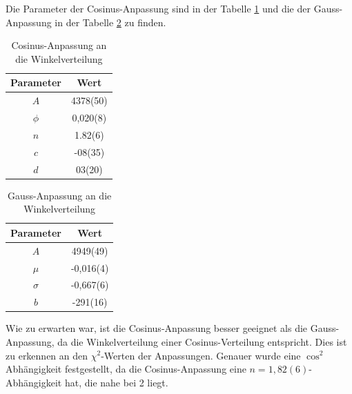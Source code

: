 \documentclass{article}
\begin{document}
Die Parameter der Cosinus-Anpassung sind in der Tabelle \ref{tab:CosinusAnpassungWinkelverteilung} und die der Gauss-Anpassung in der Tabelle \ref{tab:GaussAnpassungWinkelverteilung} zu finden.
\begin{table}[H]
    \centering
    \caption{Cosinus-Anpassung an die Winkelverteilung}
    \begin{tabular}{|c|c|}
        \hline
        Parameter & Wert \\ \hline \hline
        $A$ & 4378(50) \\ \hline 
        $\phi$ & 0,020(8) \\ \hline
        $n$ & 1.82(6) \\ \hline
        $c$ & -08(35) \\ \hline
        $d$ & 03(20) \\ \hline
    \end{tabular}
    \label{tab:CosinusAnpassungWinkelverteilung}
\end{table}
\begin{table}[H]
    \centering
    \caption{Gauss-Anpassung an die Winkelverteilung}
    \begin{tabular}{|c|c|}
        \hline
        Parameter & Wert \\ \hline \hline
        $A$ & 4949(49) \\ \hline
        $\mu$ & -0,016(4) \\ \hline
        $\sigma$ & -0,667(6) \\ \hline
        $b$ & -291(16) \\ \hline
    \end{tabular}
    \label{tab:GaussAnpassungWinkelverteilung}
\end{table}
Wie zu erwarten war, ist die Cosinus-Anpassung besser geeignet als die Gauss-Anpassung, da die Winkelverteilung einer Cosinus-Verteilung entspricht. Dies ist zu erkennen an den $\chi^2$-Werten der Anpassungen.
Genauer wurde eine $\cos^2$ Abhängigkeit festgestellt, da die Cosinus-Anpassung eine $n=1,82(6)$-Abhängigkeit hat, die nahe bei 2 liegt.
\end{document}

